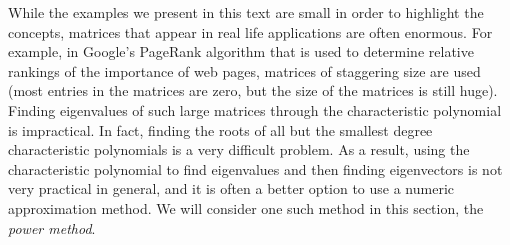\label{sec:power_method}

While the examples we present in this text are small in order to highlight the concepts, matrices that appear in real life applications are often enormous. For example, in Google's PageRank algorithm that is used to determine relative rankings of the importance of web pages, matrices of staggering size are used (most entries in the matrices are zero, but the size of the matrices is still huge). Finding eigenvalues of such large matrices through the characteristic polynomial is impractical. In fact, finding the roots of all but the smallest degree characteristic polynomials is a very difficult problem. As a result, using the characteristic polynomial to find eigenvalues and then finding eigenvectors is not very practical in general, and it is often a better option to use a numeric approximation method. We will consider one such method in this section, the \emph{power method}. 

